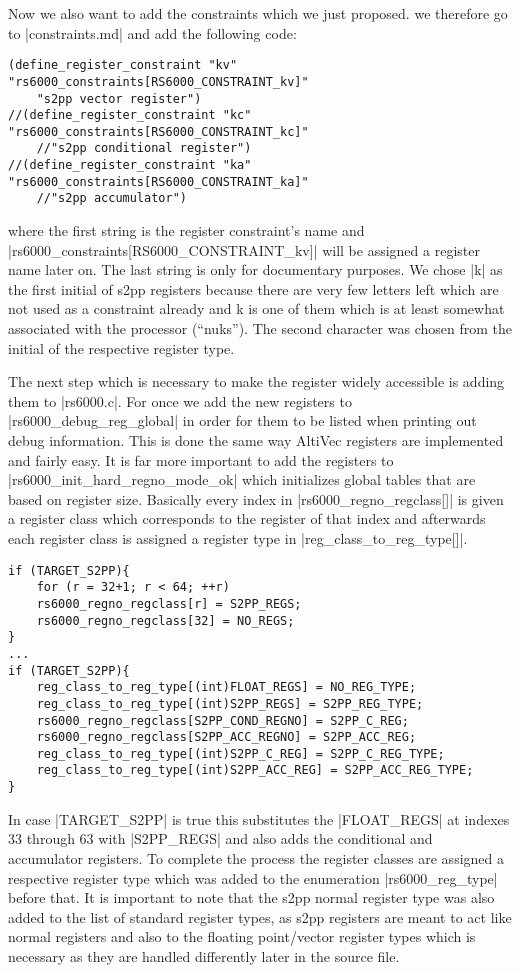 Now we also want to add the constraints which we just proposed.
we therefore go to |constraints.md| and add the following code:
\begin{lstlisting}
(define_register_constraint "kv" "rs6000_constraints[RS6000_CONSTRAINT_kv]"
    "s2pp vector register")
//(define_register_constraint "kc" "rs6000_constraints[RS6000_CONSTRAINT_kc]"
    //"s2pp conditional register")
//(define_register_constraint "ka" "rs6000_constraints[RS6000_CONSTRAINT_ka]"
    //"s2pp accumulator")
\end{lstlisting}
where the first string is the register constraint's name and |rs6000_constraints[RS6000_CONSTRAINT_kv]| will be assigned a register name later on.
The last string is only for documentary purposes.
We chose |k| as the first initial of s2pp registers because there are very few letters left which are not used as a constraint already and k is one of them which is at least somewhat associated with the processor (``nuks'').
The second character was chosen from the initial of the respective register type.

The next step which is necessary to make the register widely accessible is adding them to |rs6000.c|.
For once we add the new registers to |rs6000_debug_reg_global| in order for them to be listed when printing out debug information.
This is done the same way AltiVec registers are implemented and fairly easy.
It is far more important to add the registers to |rs6000_init_hard_regno_mode_ok| which initializes global tables that are based on register size.
Basically every index in |rs6000_regno_regclass[]| is given a register class which corresponds to the register of that index and afterwards each register class is assigned a register type in |reg_class_to_reg_type[]|.
\begin{lstlisting}
if (TARGET_S2PP){
    for (r = 32+1; r < 64; ++r)
    rs6000_regno_regclass[r] = S2PP_REGS;
    rs6000_regno_regclass[32] = NO_REGS;
}
...
if (TARGET_S2PP){
    reg_class_to_reg_type[(int)FLOAT_REGS] = NO_REG_TYPE;
    reg_class_to_reg_type[(int)S2PP_REGS] = S2PP_REG_TYPE;
    rs6000_regno_regclass[S2PP_COND_REGNO] = S2PP_C_REG;
    rs6000_regno_regclass[S2PP_ACC_REGNO] = S2PP_ACC_REG;
    reg_class_to_reg_type[(int)S2PP_C_REG] = S2PP_C_REG_TYPE;
    reg_class_to_reg_type[(int)S2PP_ACC_REG] = S2PP_ACC_REG_TYPE;
}
\end{lstlisting} 

In case |TARGET_S2PP| is true this substitutes the |FLOAT_REGS| at indexes 33 through 63 with |S2PP_REGS| and also adds the conditional and accumulator registers.
To complete the process the register classes are assigned a respective register type which was added to the enumeration |rs6000_reg_type| before that.
It is important to note that the s2pp normal register type was also added to the list of standard register types, as s2pp registers are meant to act like normal registers and also to the floating point/vector register types which is necessary as they are handled differently later in the source file.



